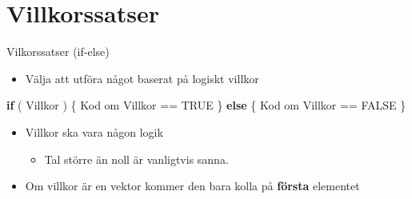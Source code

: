 \documentclass[
  11pt,
  ignorenonframetext,
]{beamer}
\newenvironment{Shaded}{\begin{snugshade}}{\end{snugshade}}
\newcommand{\ConstantTok}[1]{\textcolor[rgb]{0.00,0.00,0.00}{#1}}
\newcommand{\ControlFlowTok}[1]{\textcolor[rgb]{0.13,0.29,0.53}{\textbf{#1}}}
\newcommand{\NormalTok}[1]{#1}
\newcommand{\SpecialCharTok}[1]{\textcolor[rgb]{0.00,0.00,0.00}{#1}}
\providecommand{\tightlist}{%
  \setlength{\itemsep}{0pt}\setlength{\parskip}{0pt}}
\newcommand\imp[1]{\alert{\textbf{#1}}}
\begin{document}
\hypertarget{villkorssatser}{%
\section{Villkorssatser}\label{villkorssatser}}

\begin{frame}[fragile]{Vilkorssatser (if-else)}
\protect\hypertarget{vilkorssatser-if-else}{}
\begin{itemize}
\tightlist
\item
  Välja att utföra något baserat på logiskt villkor
\end{itemize}

\begin{Shaded}
\begin{Highlighting}[]
\ControlFlowTok{if}\NormalTok{ ( Villkor ) \{}
\NormalTok{  Kod om Villkor }\SpecialCharTok{==} \ConstantTok{TRUE}
\NormalTok{\} }\ControlFlowTok{else}\NormalTok{ \{}
\NormalTok{  Kod om Villkor }\SpecialCharTok{==} \ConstantTok{FALSE}
\NormalTok{\}}
\end{Highlighting}
\end{Shaded}

\begin{itemize}
\tightlist
\item
  Villkor ska vara någon logik

  \begin{itemize}
  \tightlist
  \item
    Tal större än noll är vanligtvis sanna.
  \end{itemize}
\item
  Om villkor är en vektor kommer den bara kolla på \imp{första}
  elementet
\end{itemize}
\end{frame}
\end{document}
